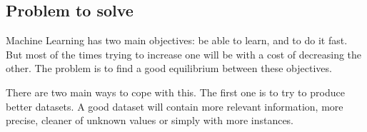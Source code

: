 \documentclass{article}
\begin{document}
    \subsection{Problem to solve}


    Machine Learning has two main objectives: be able to learn, and to do it fast.
    But most of the times trying to increase one will be with a cost
    of decreasing the other. The problem is to find a good equilibrium
    between these objectives.

    There are two main ways to cope with this. The first one is to
    try to produce better datasets. A good dataset will contain more relevant
    information, more precise, cleaner of unknown values or simply with more
    instances.
\end{document}
